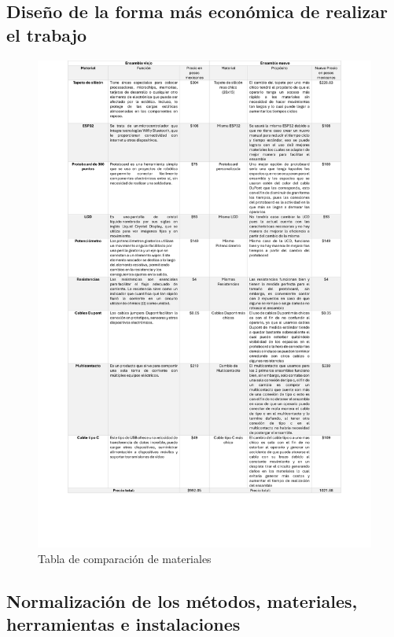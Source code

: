     \subsection{Diseño de la forma más económica de realizar el trabajo}
    
        \begin{figure}[H]
        \centering
        \includegraphics[scale=0.165]{15/img/tablaEconomicaTrabajo.pdf}
        \caption{Tabla de comparación de materiales}
        \label{fig:tablaEconomicaTrabajo}
        \end{figure}
    \subsection{Normalización de los métodos, materiales, herramientas e instalaciones}
    
